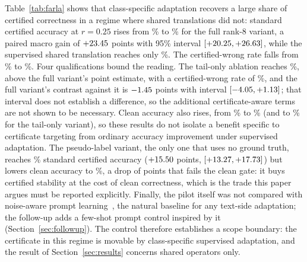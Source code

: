 Table~\ref{tab:farla} shows that class-specific adaptation recovers a large
share of certified correctness in a regime where shared translations did not:
standard certified accuracy at $r=0.25$ rises from \FarlaIdentityStdCA\% to
\FarlaFullStdCA\% for the full rank-8 variant, a paired macro gain of
$+23.45$ points with 95\% interval
$[+20.25,+26.63]$, while the supervised shared
translation reaches only \FarlaSharedStdCA\%. The certified-wrong rate falls
from \FarlaIdentityCW\% to \FarlaFullCW\%. Four qualifications bound the
reading. The tail-only ablation reaches \FarlaTailStdCA\%, above the full variant's
point estimate, with a certified-wrong rate of \FarlaTailCW\%, and the full
variant's contrast against it is
$-1.45$ points with interval
$[-4.05,+1.13]$; that interval does not establish a
difference, so the additional certificate-aware terms are not shown to be
necessary. Clean accuracy also rises, from
\FarlaIdentityClean\% to \FarlaFullClean\% (and to \FarlaTailClean\% for the
tail-only variant), so these results do not isolate a benefit specific to
certificate targeting from ordinary accuracy improvement under supervised
adaptation. The pseudo-label variant, the only one that uses no
ground truth, reaches \FarlaPseudoStdCA\% standard certified accuracy
($+15.50$ points,
$[+13.27,+17.73]$) but lowers clean
accuracy to \FarlaPseudoClean\%, a drop of \FarlaPseudoCleanDrop{} points that
fails the clean gate: it buys certified stability at the cost of clean
correctness, which is the trade this paper argues must be reported explicitly.
Finally, the pilot itself was not compared with noise-aware prompt
learning~\cite{hussein2024promptsmooth}, the natural baseline for any text-side
adaptation; the follow-up adds a few-shot prompt control inspired by it
(Section~\ref{sec:followup}). The control therefore establishes a scope boundary: the certificate
in this regime is movable by class-specific supervised adaptation, and the
result of Section~\ref{sec:results} concerns shared operators only.
